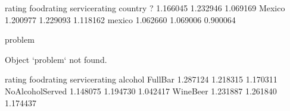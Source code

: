 \documentclass[letterpaper,10pt,english]{jupyterBook}
\begin{document}
\begin{sphinxVerbatim}[commandchars=\\\{\}]
           rating  food\PYGZus{}rating  service\PYGZus{}rating
country                                       
?        1.166045     1.232946        1.069169
Mexico   1.200977     1.229093        1.118162
mexico   1.062660     1.069006        0.900064
\end{sphinxVerbatim}

\begin{sphinxVerbatim}[commandchars=\\\{\}]
     problem
\end{sphinxVerbatim}

\begin{sphinxVerbatim}[commandchars=\\\{\}]
Object `problem` not found.
\end{sphinxVerbatim}

\begin{sphinxVerbatim}[commandchars=\\\{\}]
\PYG{p}{[}\PYG{p}{[}  \PYG{p}{]}\PYG{p}{]}
\end{sphinxVerbatim}

\begin{sphinxVerbatim}[commandchars=\\\{\}]
                     rating  food\PYGZus{}rating  service\PYGZus{}rating
alcohol                                                 
Full\PYGZus{}Bar           1.287124     1.218315        1.170311
No\PYGZus{}Alcohol\PYGZus{}Served  1.148075     1.194730        1.042417
Wine\PYGZhy{}Beer          1.231887     1.261840        1.174437
\end{sphinxVerbatim}

\begin{sphinxVerbatim}[commandchars=\\\{\}]
\PYG{p}{[}\PYG{p}{[}  \PYG{p}{]}\PYG{p}{]}
\end{sphinxVerbatim}
\end{document}
